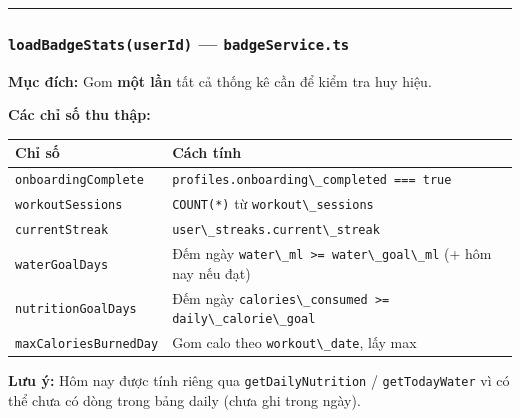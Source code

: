 \documentclass[12pt,a4paper]{article}
\newcounter{none}
\providecommand{\passthrough}[1]{#1}
\begin{document}
\begin{center}\rule{0.5\linewidth}{0.5pt}\end{center}

\subsubsection{\texorpdfstring{\texttt{loadBadgeStats(userId)} ---
\texttt{badgeService.ts}}{loadBadgeStats(userId) --- badgeService.ts}}\label{loadbadgestatsuserid-badgeservice.ts}

\textbf{Mục đích:} Gom \textbf{một lần} tất cả thống kê cần để kiểm tra
huy hiệu.

\textbf{Các chỉ số thu thập:}

{\def\LTcaptype{none} %
\begin{longtable}[]{@{}
  >{\raggedright\arraybackslash}p{}
  >{\raggedright\arraybackslash}p{}@{}}
\toprule\noalign{}
\begin{minipage}[b]{\linewidth}\raggedright
Chỉ số
\end{minipage} & \begin{minipage}[b]{\linewidth}\raggedright
Cách tính
\end{minipage} \\
\midrule\noalign{}
\endhead
\bottomrule\noalign{}
\endlastfoot
\passthrough{\lstinline!onboardingComplete!} &
\passthrough{\lstinline!profiles.onboarding\_completed === true!} \\
\passthrough{\lstinline!workoutSessions!} &
\passthrough{\lstinline!COUNT(*)!} từ
\passthrough{\lstinline!workout\_sessions!} \\
\passthrough{\lstinline!currentStreak!} &
\passthrough{\lstinline!user\_streaks.current\_streak!} \\
\passthrough{\lstinline!waterGoalDays!} & Đếm ngày
\passthrough{\lstinline!water\_ml >= water\_goal\_ml!} (+ hôm nay nếu
đạt) \\
\passthrough{\lstinline!nutritionGoalDays!} & Đếm ngày
\passthrough{\lstinline!calories\_consumed >= daily\_calorie\_goal!} \\
\passthrough{\lstinline!maxCaloriesBurnedDay!} & Gom calo theo
\passthrough{\lstinline!workout\_date!}, lấy max \\
\end{longtable}
}

\textbf{Lưu ý:} Hôm nay được tính riêng qua
\passthrough{\lstinline!getDailyNutrition!} /
\passthrough{\lstinline!getTodayWater!} vì có thể chưa có dòng trong
bảng daily (chưa ghi trong ngày).
\end{document}
